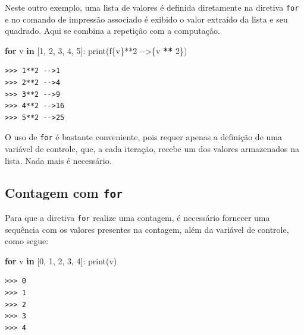 \documentclass[
]{book}
\newenvironment{Shaded}{\begin{snugshade}}{\end{snugshade}}
\newcommand{\BuiltInTok}[1]{#1}
\newcommand{\ControlFlowTok}[1]{\textcolor[rgb]{0.13,0.29,0.53}{\textbf{#1}}}
\newcommand{\DecValTok}[1]{\textcolor[rgb]{0.00,0.00,0.81}{#1}}
\newcommand{\KeywordTok}[1]{\textcolor[rgb]{0.13,0.29,0.53}{\textbf{#1}}}
\newcommand{\NormalTok}[1]{#1}
\newcommand{\OperatorTok}[1]{\textcolor[rgb]{0.81,0.36,0.00}{\textbf{#1}}}
\newcommand{\SpecialCharTok}[1]{\textcolor[rgb]{0.00,0.00,0.00}{#1}}
\newcommand{\SpecialStringTok}[1]{\textcolor[rgb]{0.31,0.60,0.02}{#1}}
\begin{document}
Neste outro exemplo, uma lista de valores é definida diretamente na diretiva \texttt{for} e no comando de impressão associado é exibido o valor extraído da lista e seu quadrado. Aqui se combina a repetição com a computação.

\begin{Shaded}
\begin{Highlighting}[]
\ControlFlowTok{for}\NormalTok{ v }\KeywordTok{in}\NormalTok{ [}\DecValTok{1}\NormalTok{, }\DecValTok{2}\NormalTok{, }\DecValTok{3}\NormalTok{, }\DecValTok{4}\NormalTok{, }\DecValTok{5}\NormalTok{]:}
    \BuiltInTok{print}\NormalTok{(}\SpecialStringTok{f\textquotesingle{}}\SpecialCharTok{\{v\}}\SpecialStringTok{**2 {-}{-}\textgreater{}}\SpecialCharTok{\{v} \OperatorTok{**} \DecValTok{2}\SpecialCharTok{\}}\SpecialStringTok{\textquotesingle{}}\NormalTok{)}
\end{Highlighting}
\end{Shaded}

\begin{verbatim}
>>> 1**2 -->1
>>> 2**2 -->4
>>> 3**2 -->9
>>> 4**2 -->16
>>> 5**2 -->25
\end{verbatim}

O uso de \texttt{for} é bastante conveniente, pois requer apenas a definição de uma variável de controle, que, a cada iteração, recebe um dos valores armazenados na lista. Nada mais é necessário.

\hypertarget{repet-for-conta}{%
\subsection{\texorpdfstring{Contagem com \texttt{for}}{Contagem com for}}\label{repet-for-conta}}

Para que a diretiva \texttt{for} realize uma contagem, é necessário fornecer uma sequência com os valores presentes na contagem, além da variável de controle, como segue:

\begin{Shaded}
\begin{Highlighting}[]
\ControlFlowTok{for}\NormalTok{ v }\KeywordTok{in}\NormalTok{ [}\DecValTok{0}\NormalTok{, }\DecValTok{1}\NormalTok{, }\DecValTok{2}\NormalTok{, }\DecValTok{3}\NormalTok{, }\DecValTok{4}\NormalTok{]:}
    \BuiltInTok{print}\NormalTok{(v)}
\end{Highlighting}
\end{Shaded}

\begin{verbatim}
>>> 0
>>> 1
>>> 2
>>> 3
>>> 4
\end{verbatim}
\end{document}
